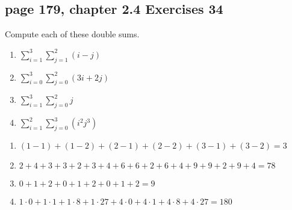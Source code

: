 \documentclass[sigconf]{acmart}
\begin{document}
\subsection{page 179, chapter 2.4 Exercises 34}
\begin{shaded}
    Compute each of these double sums.
    \begin{enumerate}[label=(\alph*)]
    	\item $\sum\limits_{i=1}^3 \sum\limits_{j=1}^2 (i-j)$
    	\item $\sum\limits_{i=0}^3 \sum\limits_{j=0}^2 (3i+2j)$
    	\item $\sum\limits_{i=1}^3 \sum\limits_{j=0}^2 j$
    	\item $\sum\limits_{i=1}^2 \sum\limits_{j=0}^3 (i^2j^3)$
    \end{enumerate}
\end{shaded}  
\begin{enumerate}[label=(\alph*)]
	\item $(1-1)+(1-2)+(2-1)+(2-2)+(3-1)+(3-2) = 3$
	\item \uline{$2+4+3+3+2+3+4+6+6+2+6+4+9+9+2+9+4= 78$}
	\item \uline{$0+1+2+0+1+2+0+1+2=9$}
	\item \uline{$1\cdot 0+1\cdot 1+1\cdot 8+1\cdot 27+4\cdot 0+4\cdot 1+4\cdot 8+4\cdot 27 =180 $}
\end{enumerate}
\end{document}

